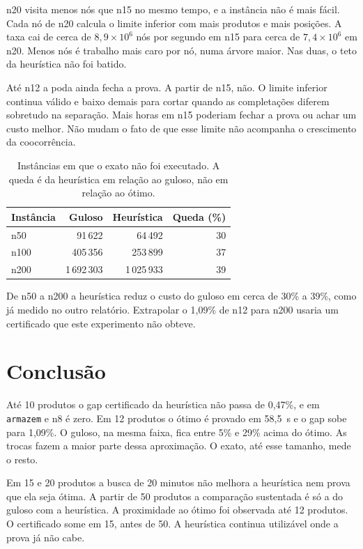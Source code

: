 \documentclass[conference,a4paper]{IEEEtran}
\begin{document}
n20 visita menos nós que n15 no mesmo tempo, e a instância não é mais fácil.
Cada nó de n20 calcula o limite inferior com mais produtos e mais posições.
A taxa cai de cerca de \(8{,}9 \times 10^{6}\) nós por segundo em n15 para cerca de \(7{,}4 \times 10^{6}\) em n20.
Menos nós é trabalho mais caro por nó, numa árvore maior.
Nas duas, o teto da heurística não foi batido.

Até n12 a poda ainda fecha a prova.
A partir de n15, não.
O limite inferior continua válido e baixo demais para cortar quando as completações diferem sobretudo na separação.
Mais horas em n15 poderiam fechar a prova ou achar um custo melhor.
Não mudam o fato de que esse limite não acompanha o crescimento da coocorrência.

\begin{table}[H]
\caption{Instâncias em que o exato não foi executado.
A queda é da heurística em relação ao guloso, não em relação ao ótimo.}
\label{tab:grandes}
\centering
\begin{tabular}{|l|r|r|r|}
\hline
Instância & Guloso & Heurística & Queda (\%) \\
\hline
n50 & 91\,622 & 64\,492 & 30 \\
n100 & 405\,356 & 253\,899 & 37 \\
n200 & 1\,692\,303 & 1\,025\,933 & 39 \\
\hline
\end{tabular}
\end{table}

De n50 a n200 a heurística reduz o custo do guloso em cerca de 30\% a 39\%, como já medido no outro relatório.
Extrapolar o 1,09\% de n12 para n200 usaria um certificado que este experimento não obteve.

\section{Conclusão}
Até 10 produtos o gap certificado da heurística não passa de 0,47\%, e em \texttt{armazem} e n8 é zero.
Em 12 produtos o ótimo é provado em 58,5~s e o gap sobe para 1,09\%.
O guloso, na mesma faixa, fica entre 5\% e 29\% acima do ótimo.
As trocas fazem a maior parte dessa aproximação.
O exato, até esse tamanho, mede o resto.

Em 15 e 20 produtos a busca de 20 minutos não melhora a heurística nem prova que ela seja ótima.
A partir de 50 produtos a comparação sustentada é só a do guloso com a heurística.
A proximidade ao ótimo foi observada até 12 produtos.
O certificado some em 15, antes de 50.
A heurística continua utilizável onde a prova já não cabe.
\end{document}
